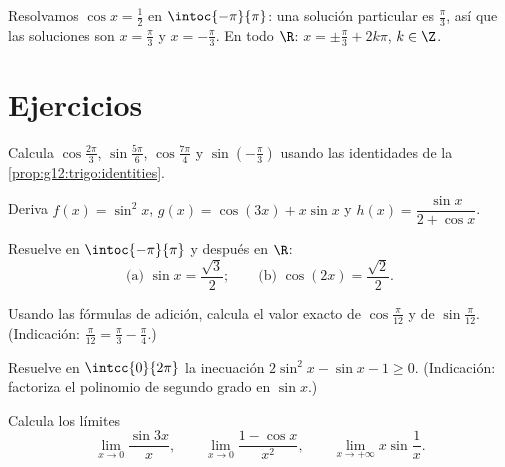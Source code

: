 \begin{example}\label{ex:g12:trigo:equation}
Resolvamos $\cos x = \frac12$ en $\intoc{-\pi}{\pi}$: una solución
particular es $\frac\pi3$, así que las soluciones son $x = \frac\pi3$ y
$x = -\frac\pi3$. En todo $\R$: $x = \pm\frac\pi3 + 2k\pi$, $k \in \Z$.
\end{example}

\section{Ejercicios}

\begin{exercise}[$\star$]\label{exo:g12:trigo:1}
Calcula $\cos\frac{2\pi}{3}$, $\sin\frac{5\pi}{6}$, $\cos\frac{7\pi}{4}$ y
$\sin\left(-\frac{\pi}{3}\right)$ usando las identidades de la
\cref{prop:g12:trigo:identities}.
\end{exercise}

\begin{exercise}[$\star$]\label{exo:g12:trigo:2}
Deriva $f(x) = \sin^2 x$, $g(x) = \cos(3x) + x\sin x$ y
$h(x) = \dfrac{\sin x}{2 + \cos x}$.
\end{exercise}

\begin{exercise}[$\star$]\label{exo:g12:trigo:3}
Resuelve en $\intoc{-\pi}{\pi}$ y después en $\R$:
\[
\text{(a) } \sin x = \frac{\sqrt3}{2};
\qquad
\text{(b) } \cos\left(2x\right) = \frac{\sqrt2}{2} .
\]
\end{exercise}

\begin{exercise}[$\star\star$]\label{exo:g12:trigo:4}
Usando las fórmulas de adición, calcula el valor exacto de
$\cos\frac{\pi}{12}$ y de $\sin\frac{\pi}{12}$. (Indicación:
$\frac{\pi}{12} = \frac{\pi}{3} - \frac{\pi}{4}$.)
\end{exercise}

\begin{exercise}[$\star\star$]\label{exo:g12:trigo:5}
Resuelve en $\intcc{0}{2\pi}$ la inecuación
$2\sin^2 x - \sin x - 1 \geq 0$. (Indicación: factoriza el polinomio de
segundo grado en $\sin x$.)
\end{exercise}

\begin{exercise}[$\star\star$]\label{exo:g12:trigo:6}
Calcula los límites
\[
\lim_{x\to0} \frac{\sin 3x}{x}, \qquad
\lim_{x\to0} \frac{1 - \cos x}{x^2}, \qquad
\lim_{x\to+\infty} x \sin\frac{1}{x}.
\]
\end{exercise}

